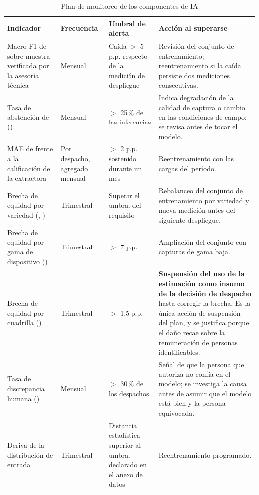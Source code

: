 \begin{table}[H]
\centering\footnotesize
\caption{Plan de monitoreo de los componentes de IA}
\label{tab:monitoreo-ia-inf}
\begin{tabular}{|L{3.8cm}|C{2.0cm}|C{2.4cm}|L{5.8cm}|}
\hline
{}\textbf{Indicador} & \textbf{Frecuencia} & \textbf{Umbral de alerta} & \textbf{Acción al superarse}\\ \hline
Macro-F1 de  sobre muestra verificada por la asesoría técnica & Mensual & Caída $>$ 5 p.p. respecto de la medición de despliegue & Revisión del conjunto de entrenamiento; reentrenamiento si la caída persiste dos mediciones consecutivas.\\ \hline
Tasa de abstención de  () & Mensual & $>$ 25\,\% de las inferencias & Indica degradación de la calidad de captura o cambio en las condiciones de campo; se revisa antes de tocar el modelo.\\ \hline
MAE de  frente a la calificación de la extractora & Por despacho, agregado mensual & $>$ 2 p.p. sostenido durante un mes & Reentrenamiento con las cargas del período.\\ \hline
Brecha de equidad por variedad (, ) & Trimestral & Superar el umbral del requisito & Rebalanceo del conjunto de entrenamiento por variedad y nueva medición antes del siguiente despliegue.\\ \hline
Brecha de equidad por gama de dispositivo () & Trimestral & $>$ 7 p.p. & Ampliación del conjunto con capturas de gama baja.\\ \hline
Brecha de equidad por cuadrilla () & Trimestral & $>$ 1,5 p.p. & \textbf{Suspensión del uso de la estimación como insumo de la decisión de despacho} hasta corregir la brecha. Es la única acción de suspensión del plan, y se justifica porque el daño recae sobre la remuneración de personas identificables.\\ \hline
Tasa de discrepancia humana () & Mensual & $>$ 30\,\% de los despachos & Señal de que la persona que autoriza no confía en el modelo; se investiga la causa antes de asumir que el modelo está bien y la persona equivocada.\\ \hline
Deriva de la distribución de entrada & Trimestral & Distancia estadística superior al umbral declarado en el anexo de datos & Reentrenamiento programado.\\ \hline
\end{tabular}
\end{table}

